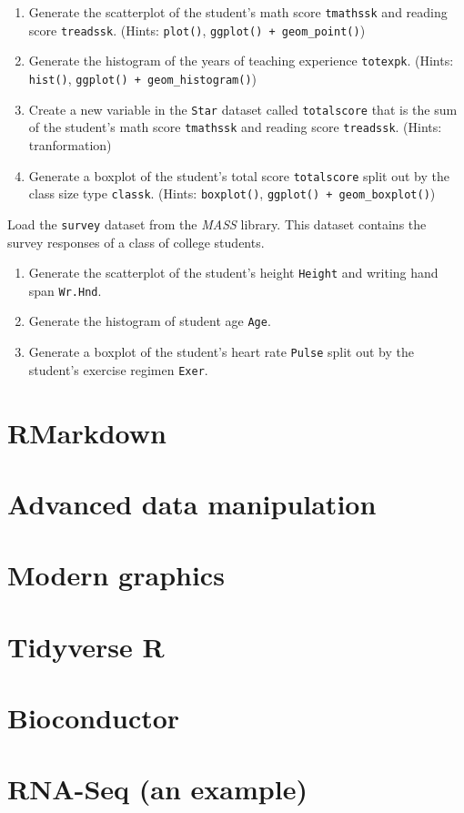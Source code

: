 \documentclass[
]{book}
\providecommand{\tightlist}{%
  \setlength{\itemsep}{0pt}\setlength{\parskip}{0pt}}
\begin{document}
\begin{enumerate}
\def\labelenumi{\arabic{enumi}.}
\tightlist
\item
  Generate the scatterplot of the student's math score \texttt{tmathssk} and reading score \texttt{treadssk}. (Hints: \texttt{plot()}, \texttt{ggplot()\ +\ geom\_point()})
\item
  Generate the histogram of the years of teaching experience \texttt{totexpk}. (Hints: \texttt{hist()}, \texttt{ggplot()\ +\ geom\_histogram()})
\item
  Create a new variable in the \texttt{Star} dataset called \texttt{totalscore} that is the sum of the student's math score \texttt{tmathssk} and reading score \texttt{treadssk}. (Hints: tranformation)
\item
  Generate a boxplot of the student's total score \texttt{totalscore} split out by the class size type \texttt{classk}. (Hints: \texttt{boxplot()}, \texttt{ggplot()\ +\ geom\_boxplot()})
\end{enumerate}

Load the \texttt{survey} dataset from the \emph{MASS} library. This dataset contains the survey responses of a class of college students.

\begin{enumerate}
\def\labelenumi{\arabic{enumi}.}
\setcounter{enumi}{4}
\tightlist
\item
  Generate the scatterplot of the student's height \texttt{Height} and writing hand span \texttt{Wr.Hnd}.
\item
  Generate the histogram of student age \texttt{Age}.
\item
  Generate a boxplot of the student's heart rate \texttt{Pulse} split out by the student's exercise regimen \texttt{Exer}.
\end{enumerate}

\hypertarget{rmarkdown}{%
\chapter{RMarkdown}\label{rmarkdown}}

\hypertarget{advanced-data-manipulation}{%
\chapter{Advanced data manipulation}\label{advanced-data-manipulation}}

\hypertarget{modern-graphics}{%
\chapter{Modern graphics}\label{modern-graphics}}

\hypertarget{tidyverse-r}{%
\chapter{Tidyverse R}\label{tidyverse-r}}

\hypertarget{bioconductor}{%
\chapter{Bioconductor}\label{bioconductor}}

\hypertarget{rna-seq-an-example}{%
\chapter{RNA-Seq (an example)}\label{rna-seq-an-example}}

  
\end{document}
